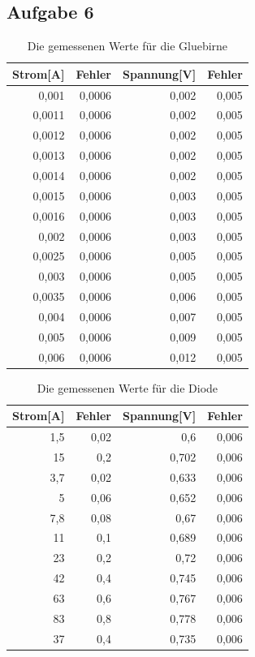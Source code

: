\documentclass[12pt]{scrartcl}
\begin{document}
\subsection{Aufgabe 6}
\begin{table}[htbp]
\caption{Die gemessenen Werte für die Gluebirne}
\begin{tabular}{|r|r|r|r|}
\hline
\multicolumn{1}{|l|}{Strom[A]} & \multicolumn{1}{l|}{Fehler} & \multicolumn{1}{l|}{Spannung[V]} & \multicolumn{1}{l|}{Fehler} \\ \hline
0,001 & 0,0006 & 0,002 & 0,005 \\ \hline
0,0011 & 0,0006 & 0,002 & 0,005 \\ \hline
0,0012 & 0,0006 & 0,002 & 0,005 \\ \hline
0,0013 & 0,0006 & 0,002 & 0,005 \\ \hline
0,0014 & 0,0006 & 0,002 & 0,005 \\ \hline
0,0015 & 0,0006 & 0,003 & 0,005 \\ \hline
0,0016 & 0,0006 & 0,003 & 0,005 \\ \hline
0,002 & 0,0006 & 0,003 & 0,005 \\ \hline
0,0025 & 0,0006 & 0,005 & 0,005 \\ \hline
0,003 & 0,0006 & 0,005 & 0,005 \\ \hline
0,0035 & 0,0006 & 0,006 & 0,005 \\ \hline
0,004 & 0,0006 & 0,007 & 0,005 \\ \hline
0,005 & 0,0006 & 0,009 & 0,005 \\ \hline
0,006 & 0,0006 & 0,012 & 0,005 \\ \hline
\end{tabular}
\label{aufgabe_6_gluebirne}
\end{table}

\begin{table}[htbp]
\caption{Die gemessenen Werte für die Diode}
\begin{tabular}{|r|r|r|r|}
\hline
\multicolumn{1}{|l|}{Strom[A]} & \multicolumn{1}{l|}{Fehler} & \multicolumn{1}{l|}{Spannung[V]} & \multicolumn{1}{l|}{Fehler} \\ \hline
1,5 & 0,02 & 0,6 & 0,006 \\ \hline
15 & 0,2 & 0,702 & 0,006 \\ \hline
3,7 & 0,02 & 0,633 & 0,006 \\ \hline
5 & 0,06 & 0,652 & 0,006 \\ \hline
7,8 & 0,08 & 0,67 & 0,006 \\ \hline
11 & 0,1 & 0,689 & 0,006 \\ \hline
23 & 0,2 & 0,72 & 0,006 \\ \hline
42 & 0,4 & 0,745 & 0,006 \\ \hline
63 & 0,6 & 0,767 & 0,006 \\ \hline
83 & 0,8 & 0,778 & 0,006 \\ \hline
37 & 0,4 & 0,735 & 0,006 \\ \hline
\end{tabular}
\label{aufgabe_6_diode}
\end{table}
\end{document}
